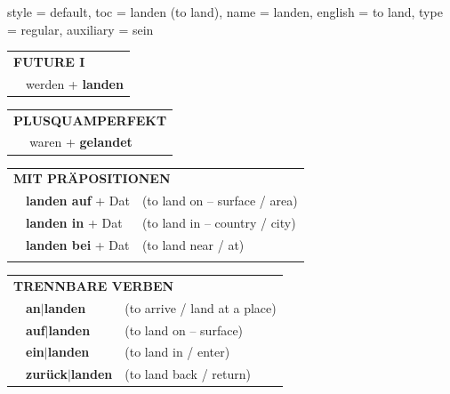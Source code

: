 \begin{verbentry}{
  style = {default},
  toc = {landen (to land)},
  name = {landen},
  english = {to land},
  type = {regular},
  auxiliary = {sein}
}
\begin{tabular}{rl}
    \multicolumn{2}{l}{\textbf{FUTURE I} }\\
   & werden + \textbf{landen}\\
 
  \end{tabular}
\hfill
   \begin{tabular}{rl}
      \multicolumn{2}{l}{\textbf{PLUSQUAMPERFEKT}}\\
   & waren + \textbf{gelandet}\\
  \end{tabular}

   \vspace{10pt}

   \begin{tabular}{lll}
      \multicolumn{3}{l}{\textbf{MIT PRÄPOSITIONEN}}\\
& \textbf{landen auf} + Dat & (to land on – surface / area)\\
& \textbf{landen in} + Dat & (to land in – country / city)\\
& \textbf{landen bei} + Dat & (to land near / at)\\
\vspace{10pt}
   \end{tabular}
  \hfill
   \begin{tabular}{lll}
      \multicolumn{3}{l}{\textbf{TRENNBARE VERBEN}}\\
 & \textbf{an$|$landen} & (to arrive / land at a place)\\
 & \textbf{auf$|$landen} & (to land on – surface)\\
 & \textbf{ein$|$landen} & (to land in / enter)\\
 & \textbf{zurück$|$landen} & (to land back / return)\\
  \end{tabular}

\vspace{-5pt}
\end{verbentry}

